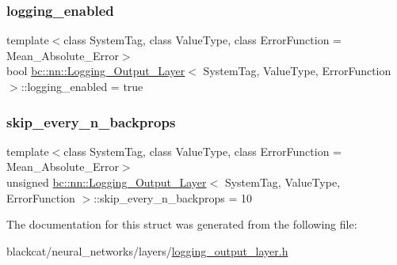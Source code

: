 \subsubsection{\texorpdfstring{logging\+\_\+enabled}{logging\_enabled}}
{\footnotesize\ttfamily template$<$class System\+Tag, class Value\+Type, class Error\+Function = Mean\+\_\+\+Absolute\+\_\+\+Error$>$ \\
bool \hyperlink{structbc_1_1nn_1_1Logging__Output__Layer}{bc\+::nn\+::\+Logging\+\_\+\+Output\+\_\+\+Layer}$<$ System\+Tag, Value\+Type, Error\+Function $>$\+::logging\+\_\+enabled = true}

\mbox{\label{structbc_1_1nn_1_1Logging__Output__Layer_a112dfc7bcd55a2e1691ab29c4894ae70}} 
\subsubsection{\texorpdfstring{skip\+\_\+every\+\_\+n\+\_\+backprops}{skip\_every\_n\_backprops}}
{\footnotesize\ttfamily template$<$class System\+Tag, class Value\+Type, class Error\+Function = Mean\+\_\+\+Absolute\+\_\+\+Error$>$ \\
unsigned \hyperlink{structbc_1_1nn_1_1Logging__Output__Layer}{bc\+::nn\+::\+Logging\+\_\+\+Output\+\_\+\+Layer}$<$ System\+Tag, Value\+Type, Error\+Function $>$\+::skip\+\_\+every\+\_\+n\+\_\+backprops = 10}



The documentation for this struct was generated from the following file\+:\begin{DoxyCompactItemize}
\item 
blackcat/neural\+\_\+networks/layers/\hyperlink{logging__output__layer_8h}{logging\+\_\+output\+\_\+layer.\+h}\end{DoxyCompactItemize}
